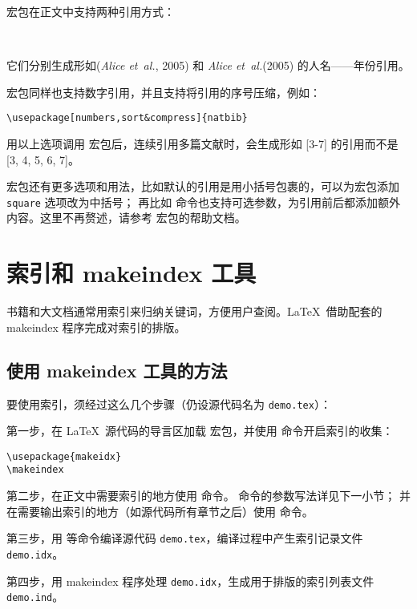  宏包在正文中支持两种引用方式：
\begin{command}
 \\
\end{command}

它们分别生成形如(\emph{Alice et~al.}, 2005) 和 \emph{Alice et~al.}(2005) 的人名——年份引用。

 宏包同样也支持数字引用，并且支持将引用的序号压缩，例如：
\begin{verbatim}
\usepackage[numbers,sort&compress]{natbib}
\end{verbatim}
用以上选项调用  宏包后，连续引用多篇文献时，会生成形如 [3-7] 的引用而不是 [3, 4, 5, 6, 7]。

 宏包还有更多选项和用法，比如默认的引用是用小括号包裹的，可以为宏包添加 \texttt{square} 选项改为中括号；
再比如  命令也支持可选参数，为引用前后都添加额外内容。这里不再赘述，请参考  宏包的帮助文档。

\section{索引和 makeindex 工具}\label{sec:index}

书籍和大文档通常用索引来归纳关键词，方便用户查阅。\LaTeX\ 借助配套的 makeindex 程序完成对索引的排版。

\subsection{使用 makeindex 工具的方法}\label{subsec:makeidx}

要使用索引，须经过这么几个步骤（仍设源代码名为 \texttt{demo.tex}）：

第一步，在 \LaTeX\ 源代码的导言区加载  宏包，并使用  命令开启索引的收集：
\begin{verbatim}
\usepackage{makeidx}
\makeindex
\end{verbatim}

第二步，在正文中需要索引的地方使用  命令。 命令的参数写法详见下一小节；
并在需要输出索引的地方（如源代码所有章节之后）使用  命令。

第三步，用  等命令编译源代码 \texttt{demo.tex}，编译过程中产生索引记录文件 \texttt{demo.idx}。

第四步，用 makeindex 程序处理 \texttt{demo.idx}，生成用于排版的索引列表文件 \texttt{demo.ind}。

